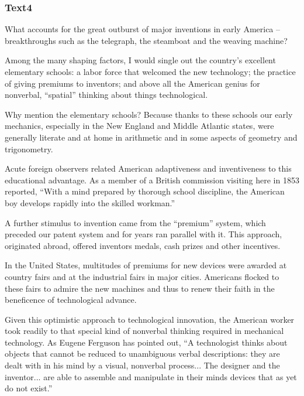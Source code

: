 \documentclass[a4paper]{article}
\begin{document}
\subsubsection{Text4}

\par
What accounts for the great outburst of major inventions in early America -- breakthroughs such as the telegraph, the steamboat and the weaving machine?

\par
Among the many shaping factors, I would single out the country’s excellent elementary schools: a labor force that welcomed the new technology; the practice of giving premiums to inventors; and above all the American genius for nonverbal, “spatial” thinking about things technological.

\par
Why mention the elementary schools? Because thanks to these schools our early mechanics, especially in the New England and Middle Atlantic states, were generally literate and at home in arithmetic and in some aspects of geometry and trigonometry.

\par
Acute foreign observers related American adaptiveness and inventiveness to this educational advantage. As a member of a British commission visiting here in 1853 reported, “With a mind prepared by thorough school discipline, the American boy develops rapidly into the skilled workman.”

\par
A further stimulus to invention came from the “premium” system, which preceded our patent system and for years ran parallel with it. This approach, originated abroad, offered inventors medals, cash prizes and other incentives.

\par
In the United States, multitudes of premiums for new devices were awarded at country fairs and at the industrial fairs in major cities. Americans flocked to these fairs to admire the new machines and thus to renew their faith in the beneficence of technological advance.

\par
Given this optimistic approach to technological innovation, the American worker took readily to that special kind of nonverbal thinking required in mechanical technology. As Eugene Ferguson has pointed out, “A technologist thinks about objects that cannot be reduced to unambiguous verbal descriptions: they are dealt with in his mind by a visual, nonverbal process... The designer and the inventor... are able to assemble and manipulate in their minds devices that as yet do not exist.”
\end{document}
